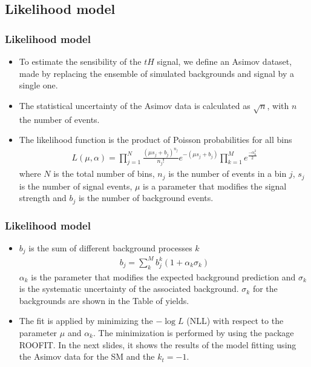 \documentclass[11pt]{beamer}
\begin{document}

\begin{frame}
\subsection{Likelihood model}
\frametitle{Likelihood model}
{\small \begin{itemize}
\item To estimate the sensibility of the $tH$ signal, we define an Asimov dataset, made by replacing the ensemble of simulated backgrounds and signal by a single one. 
\item The statistical uncertainty of the Asimov data is calculated as $\sqrt{n}$, with $n$ the number of events.\\
\item The likelihood function is the product of Poisson probabilities for all bins
\begin{align}
	L(\mu,\alpha)=\prod_{j=1}^{N}\frac{(\mu s_j +b_j)^{n_j}}{n_j !}e^{-(\mu s_j+b_j)} \prod_{k=1}^M e^{\frac{-\alpha^2_k}{2}}
\end{align}
	where $N$ is the total number of bins, $n_j$ is the number of events in a bin $j$, $s_j$ is the number of signal events, $\mu$ is a parameter that modifies the signal strength and $b_j$ is the number of background events.
\end{itemize}}
\end{frame}


\begin{frame}
\frametitle{Likelihood model}
{\small
\begin{itemize}
	\item $b_j$ is the sum of different background processes $k$
	\begin{align}
	b_j=\sum_k^M b_j^k(1+ \alpha_k \sigma_k)
	\end{align}
	$\alpha_k$ is the parameter that modifies the expected background prediction and $\sigma_k$ is the systematic uncertainty of the associated background. $\sigma_k$ for the backgrounds are shown in the Table of yields. 
		\item The fit is applied by minimizing the $-\log{L}$ (NLL) with respect to the parameter $\mu$ and $\alpha_k$. The minimization is performed by using the package ROOFIT. In the next slides, it shows the results of the model fitting using the Asimov data for the SM and the $k_t=-1$.
\end{itemize}}
\end{frame}
\end{document}
